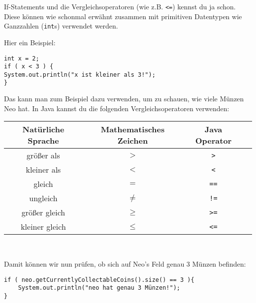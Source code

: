 \begin{Infobox}[If-Statements 2]

	If-Statements und die Vergleichsoperatoren (wie z.B. \lstinline{<=}) kennst du ja schon.
Diese können wie schonmal erwähnt zusammen mit primitiven Datentypen wie Ganzzahlen (\lstinline{int}s) verwendet werden.\newline

Hier ein Beispiel:

\begin{lstlisting}[numbers=none]
int x = 2;
if ( x < 3 ) {
System.out.println("x ist kleiner als 3!");
}
\end{lstlisting}

Das kann man zum Beispiel dazu verwenden, um zu schauen, wie viele Münzen Neo hat.
In Java kannst du die folgenden Vergleichsoperatoren verwenden:
	\begin{center}
		\begin{tabular}{ c | c | c | l }
			Natürliche Sprache & Mathematisches Zeichen & Java Operator \\
			\hline
			größer als & $>$ & \texttt{>} \\
			kleiner als & $<$ & \texttt{<} \\
			gleich & $=$ & \texttt{==}\\
			ungleich & $\neq$ & \texttt{!=} \\
			größer gleich & $\geq$ & \texttt{>=} \\
			kleiner gleich & $\leq$ & \texttt{<=} \\
        \end{tabular} \\
	\end{center}

	Damit können wir nun prüfen, ob sich auf Neo's Feld genau 3 Münzen befinden:

	\begin{lstlisting}[numbers=none]
if ( neo.getCurrentlyCollectableCoins().size() == 3 ){
	System.out.println("neo hat genau 3 Münzen!");
}
	\end{lstlisting}
\end{Infobox}


